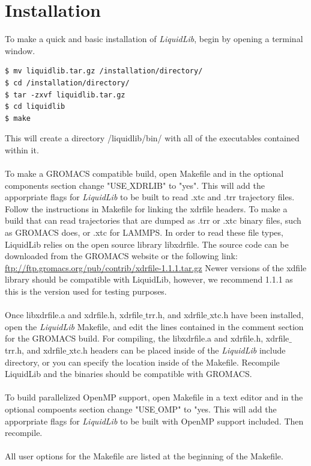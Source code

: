 \documentclass{article}
\begin{document}
\section{Installation}
To make a quick and basic installation of \textit{LiquidLib}, begin by opening a terminal window.
\begin{lstlisting}[style=BashInputStyle]
$ mv liquidlib.tar.gz /installation/directory/
$ cd /installation/directory/
$ tar -zxvf liquidlib.tar.gz
$ cd liquidlib
$ make
\end{lstlisting}
This will create a directory /liquidlib/bin/ with all of the executables contained within it.
\\
\\
To make a GROMACS compatible build, open Makefile and in the optional components section change "USE$\_$XDRLIB" to "yes".  This will add the apporpriate flags for \textit{LiquidLib} to be built to read .xtc and .trr trajectory files.  Follow the instructions in Makefile for linking the xdrfile headers. To make a build that can read trajectories that are dumped as .trr or .xtc binary files, such as GROMACS does, or .xtc for LAMMPS.  In order to read these file types, LiquidLib relies on the open source library libxdrfile.  The source code can be downloaded from the GROMACS website or the following link: \url{ftp://ftp.gromacs.org/pub/contrib/xdrfile-1.1.1.tar.gz} Newer versions of the xdfile library should be compatible with LiquidLib, however, we recommend 1.1.1 as this is the version used for testing purposes.
\\
\\
Once libxdrfile.a and xdrfile.h, xdrfile$\_$trr.h, and xdrfile$\_$xtc.h have been installed, open the \textit{LiquidLib} Makefile, and edit the lines contained in the comment section for the GROMACS build.  For compiling, the libxdrfile.a and xdrfile.h, xdrfile$\_$trr.h, and xdrfile$\_$xtc.h headers can be placed inside of the \textit{LiquidLib} include directory, or you can specify the location inside of the Makefile.  Recompile LiquidLib and the binaries should be compatible with GROMACS.
\\
\\
To build parallelized OpenMP support, open Makefile in a text editor and in the optional compoents section change "USE$\_$OMP" to "yes.  This will add the apporpriate flags for \textit{LiquidLib} to be built with OpenMP support included.  Then recompile.
\\
\\
All user options for the Makefile are listed at the beginning of the Makefile.
\end{document}
